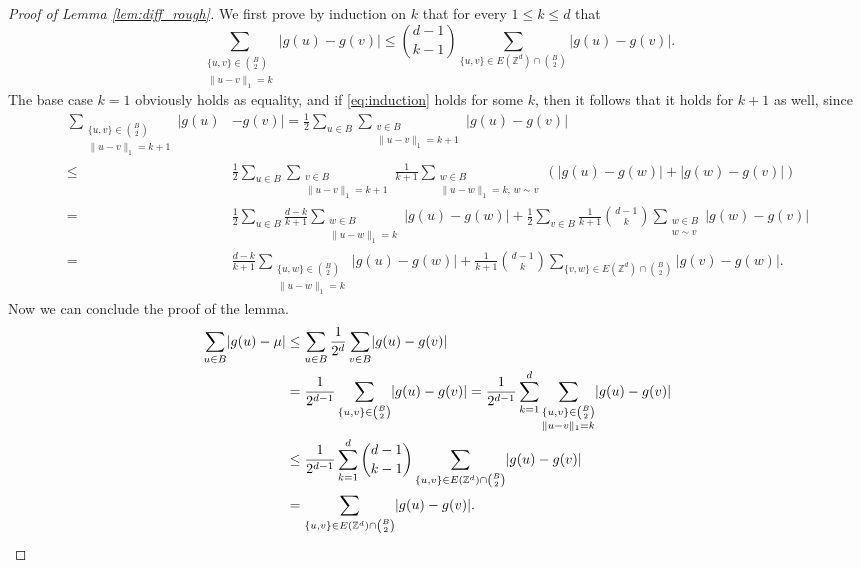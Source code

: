 \documentclass[11pt, reqno]{amsart}
\newcommand{\Z}{\mathbb{Z}}
\numberwithin{equation}{section}
\begin{document}
\begin{proof}[Proof of Lemma \ref{lem:diff_rough}]
We first prove by induction on $k$ that for every $1\leq k\leq d$ that
\begin{equation}\label{eq:induction}
\sum_{\substack{\{u,v\}\in\binom{B}{2}\\ \lVert u-v\rVert_1=k}} \lvert g(u)-g(v) \rvert
\leq\binom{d-1}{k-1}\sum_{\{u,v\}\in E(\Z^d)\cap\binom{B}{2}} \lvert g(u)-g(v) \rvert.
\end{equation}
The base case $k=1$ obviously holds as equality, and if \eqref{eq:induction} holds for some $k$, then it follows that it holds for $k+1$ as well, since
\begin{align*}
\sum_{\substack{\{u,v\}\in\binom{B}{2}\\ \lVert u-v\rVert_1=k+1}} \lvert g(u)&-g(v) \rvert=\frac{1}{2}\sum_{u\in B}\sum_{\substack{v\in B\\\lVert u-v\rVert_1=k+1}}\lvert g(u)-g(v)\rvert\\
\leq&\frac{1}{2}\sum_{u\in B}\sum_{\substack{v\in B\\\lVert u-v\rVert_1=k+1}} \frac{1}{k+1}\sum_{\substack{w\in B\\\lVert u-w\rVert_1=k,\, w\sim v}}\left(\lvert g(u)-g(w) \rvert+\lvert g(w)-g(v) \rvert \right)\\
=&\frac{1}{2}\sum_{u\in B} \frac{d-k}{k+1}\sum_{\substack{w\in B\\\lVert u-w\rVert_1=k}}\lvert g(u)-g(w) \rvert+\frac{1}{2}\sum_{v\in B} \frac{1}{k+1}\binom{d-1}{k}\sum_{\substack{w\in B\\w\sim v}}\lvert g(w)-g(v) \rvert \\
=&\frac{d-k}{k+1}\sum_{\substack{\{u,w\}\in\binom{B}{2}\\ \lVert u-w\rVert_1=k}} \lvert g(u)-g(w) \rvert+\frac{1}{k+1}\binom{d-1}{k}\sum_{\{v,w\}\in E(\Z^d)\cap\binom{B}{2}} \lvert g(v)-g(w) \rvert.
\end{align*}
Now we can conclude the proof of the lemma.
\begin{align*}
\sum_{u\in B} \lvert g(u)-\mu \rvert&\leq\sum_{u\in B} \frac{1}{2^d}\sum_{v\in B}\lvert g(u)-g(v) \rvert\\
&=\frac{1}{2^{d-1}}\sum_{\{u,v\}\in\binom{B}{2}}\lvert g(u)-g(v) \rvert=\frac{1}{2^{d-1}}\sum_{k=1}^d\sum_{\substack{\{u,v\}\in\binom{B}{2}\\ \lVert u-v\rVert_1=k}} \lvert g(u)-g(v) \rvert\\
&\leq \frac{1}{2^{d-1}}\sum_{k=1}^d\binom{d-1}{k-1} \sum_{\{u,v\}\in E(\Z^d)\cap\binom{B}{2}} \lvert g(u)-g(v) \rvert\\
&=\sum_{\{u,v\}\in E(\Z^d)\cap\binom{B}{2}} \lvert g(u)-g(v) \rvert.
\qedhere\end{align*}
\end{proof}
\end{document}
